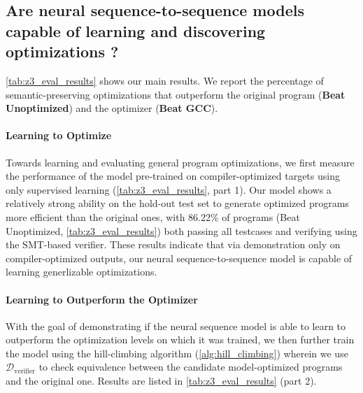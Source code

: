 \documentclass{article}
\def\correctfuncsmt/{\ensuremath{\mathcal{D}_\textrm{verifier}}}
\begin{document}
\subsection{Are  neural  sequence-to-sequence  models  capable  of learning and discovering optimizations ?}

\cref{tab:z3_eval_results} shows our main results.
We report the percentage of semantic-preserving optimizations that outperform the original program (\textbf{Beat Unoptimized}) and the optimizer (\textbf{Beat GCC}).

\paragraph{Learning to Optimize} 
Towards learning and evaluating general program optimizations, we first measure the performance of the model pre-trained on compiler-optimized targets using only supervised learning (\cref{tab:z3_eval_results}, part 1). 
Our model shows a relatively strong ability on the hold-out test set to generate optimized programs more efficient than the original ones, with 86.22\% of programs (Beat Unoptimized, \cref{tab:z3_eval_results}) both passing all testcases and verifying using the SMT-based verifier. These results indicate that via demonstration only on compiler-optimized outputs, our neural sequence-to-sequence model is capable of learning generlizable optimizations. 

\paragraph{Learning to Outperform the Optimizer} With the goal of demonstrating if the neural sequence model is able to learn to outperform the optimization levels on which it was trained, we then further train the model using the hill-climbing algorithm (\cref{alg:hill_climbing}) wherein we use \correctfuncsmt/ to check equivalence between the candidate model-optimized programs and the original one. Results are listed in \cref{tab:z3_eval_results} (part 2).
\end{document}
